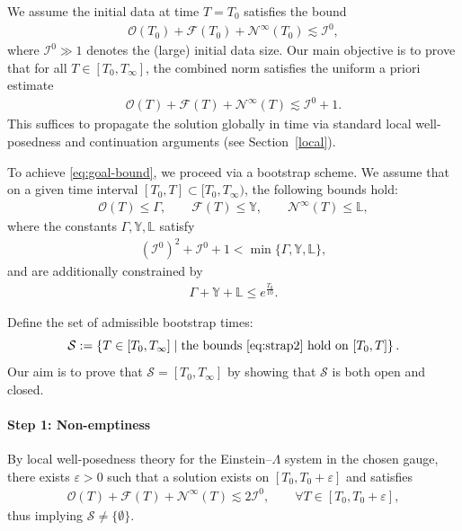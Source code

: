 \documentclass{amsart}
\begin{document}
\noindent We assume the initial data at time $T = T_0$ satisfies the bound
\begin{align} \label{eq:initial-bound}
\mathcal{O}(T_0) + \mathcal{F}(T_0) + \mathcal{N}^\infty(T_0) \lesssim \mathcal{I}^0,
\end{align}
where $\mathcal{I}^0 \gg 1$ denotes the (large) initial data size. Our main objective is to prove that for all $T \in [T_0, T_\infty]$, the combined norm satisfies the uniform a priori estimate
\begin{align} \label{eq:goal-bound}
\mathcal{O}(T) + \mathcal{F}(T) + \mathcal{N}^\infty(T) \lesssim \mathcal{I}^0 + 1.
\end{align}
This suffices to propagate the solution globally in time via standard local well-posedness and continuation arguments (see Section~\ref{local}).

\noindent To achieve \eqref{eq:goal-bound}, we proceed via a bootstrap scheme. We assume that on a given time interval $[T_0, T] \subset [T_0, T_\infty)$, the following bounds hold:
\begin{align} \label{eq:strap2}
\mathcal{O}(T) \leq \Gamma, \qquad \mathcal{F}(T) \leq \mathds{Y}, \qquad \mathcal{N}^\infty(T) \leq \mathds{L},
\end{align}
where the constants $\Gamma, \mathds{Y}, \mathds{L}$ satisfy
\begin{align} \label{eq:bootstrap-size}
(\mathcal{I}^0)^2 + \mathcal{I}^0 + 1 < \min\{\Gamma, \mathds{Y}, \mathds{L}\},
\end{align}
and are additionally constrained by
\begin{align} \label{eq:bootstrap-growth}
\Gamma + \mathds{Y} + \mathds{L} \leq e^{\frac{T_0}{10}}.
\end{align}

\noindent Define the set of admissible bootstrap times:
\[
\mathcal{S} := \left\{ T \in [T_0, T_\infty] \mid \text{the bounds \eqref{eq:strap2} hold on } [T_0, T] \right\}.
\]
Our aim is to prove that $\mathcal{S} = [T_0, T_\infty]$ by showing that $\mathcal{S}$ is both open and closed.

\paragraph{Step 1: Non-emptiness} By local well-posedness theory for the Einstein--$\Lambda$ system in the chosen gauge, there exists $\varepsilon > 0$ such that a solution exists on $[T_0, T_0 + \varepsilon]$ and satisfies
\begin{align}
\mathcal{O}(T) + \mathcal{F}(T) + \mathcal{N}^\infty(T) \lesssim 2 \mathcal{I}^0, \qquad \forall T \in [T_0, T_0 + \varepsilon],
\end{align}
thus implying $\mathcal{S} \neq \{\emptyset\}$.
\end{document}
